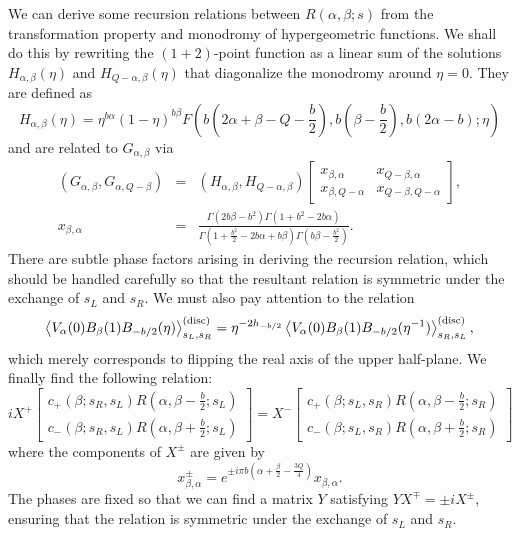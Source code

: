 \documentclass[a4paper,11pt]{article}
\newcommand{\vev}[1]{\left<{#1}\right>}
\newcommand{\tfrac}[2]{{\textstyle\frac{#1}{#2}}}
\newcommand{\IIxI}[2]{\left[\!\!\begin{array}{c}#1\\#2\end{array}\!\!\right]}
\newcommand{\IIxII}[4]{\left[\!\!\begin{array}{cc}#1&#2\\#3&#4\end{array}\!\!\right]}
\begin{document}
   We can derive some recursion relations between $R(\alpha,\beta;s)$
 from the transformation property and monodromy of
 hypergeometric functions.
 We shall do this by rewriting the $(1+2)$-point function as a linear
 sum of the solutions $H_{\alpha,\beta}(\eta)$
 and $H_{Q-\alpha,\beta}(\eta)$ that diagonalize the monodromy
 around $\eta=0$.
 They are defined as
\begin{equation}
  H_{\alpha,\beta}(\eta)=\eta^{b\alpha}(1-\eta)^{b\beta}
  F\left(b(2\alpha+\beta-Q-\tfrac{b}{2}),b(\beta-\tfrac{b}{2}),
         b(2\alpha-b);\eta\right)
\end{equation}
 and are related to $G_{\alpha,\beta}$ via
\begin{eqnarray}
    (G_{\alpha,\beta},G_{\alpha,Q-\beta})
 &=&(H_{\alpha,\beta},H_{Q-\alpha,\beta})
\IIxII{x_{\beta,\alpha}}{x_{Q-\beta,\alpha}}
      {x_{\beta,Q-\alpha}}{x_{Q-\beta,Q-\alpha}}, \nonumber \\
  x_{\beta,\alpha} &=&
    \frac{\Gamma(2b\beta-b^2)\Gamma(1+b^2-2b\alpha)}
         {\Gamma(1+\frac{b^2}{2}-2b\alpha+b\beta)
          \Gamma(b\beta-\frac{b^2}{2})}.
\end{eqnarray}
 There are subtle phase factors arising in deriving
 the recursion relation, which should be handled carefully
 so that the resultant relation is symmetric under
 the exchange of $s_L$ and $s_R$.
 We must also pay attention to the relation
\begin{equation}
  \vev{V_\alpha(0)B_\beta(1)B_{-b/2}(\eta)}^{\rm (disc)}_{s_L,s_R}
 =\eta^{-2h_{-b/2}}
  \vev{V_\alpha(0)B_\beta(1)B_{-b/2}(\eta^{-1})}^{\rm (disc)}_{s_R,s_L},
\end{equation}
 which merely corresponds to flipping the real axis
 of the upper half-plane.
 We finally find the following relation:
\begin{equation}
  iX^+\IIxI{c_+(\beta;s_R,s_L)R(\alpha,\beta-\tfrac{b}{2};s_L)}
           {c_-(\beta;s_R,s_L)R(\alpha,\beta+\tfrac{b}{2};s_L)}
 = X^-\IIxI{c_+(\beta;s_L,s_R)R(\alpha,\beta-\tfrac{b}{2};s_R)}
           {c_-(\beta;s_L,s_R)R(\alpha,\beta+\tfrac{b}{2};s_R)}
\label{recur}
\end{equation}
 where the components of $X^\pm$ are given by
\begin{equation}
  x^\pm_{\beta,\alpha}=
  e^{\pm i\pi b(\alpha+\frac{\beta}{2}-\frac{3Q}{4})}x_{\beta,\alpha}.
\end{equation}
 The phases are fixed so that we can find a matrix $Y$ satisfying
 $YX^\mp = \pm iX^\pm$, ensuring that the relation is symmetric
 under the exchange of $s_L$ and $s_R$.
\end{document}

